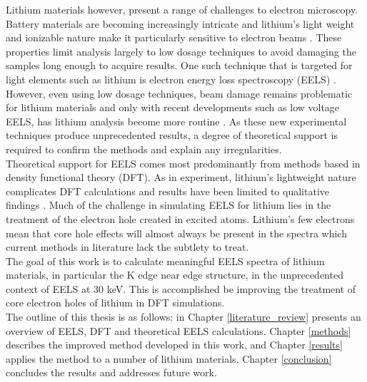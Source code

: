 Lithium materials however, present a range of challenges to electron microscopy.  Battery materials are becoming increasingly intricate and lithium's light weight and ionizable nature make it particularly sensitive to electron beams \cite{kobayashi_quantitative_2017}.  These properties limit analysis largely to low dosage techniques to avoid damaging the samples long enough to acquire results.  One such technique that is targeted for light elements such as lithium is electron energy loss spectroscopy (EELS) \cite{Egerton}.  However, even using low dosage techniques,  beam damage remains problematic for lithium materials and only with recent developments such as low voltage EELS, has lithium analysis become more routine \cite{SU_9000}. As these new experimental techniques produce unprecedented results, a degree of theoretical support is required to confirm the methods and explain any irregularities.  
\\

Theoretical support for EELS  comes most predominantly from methods based in density functional theory (DFT).  As in experiment, lithium's lightweight nature complicates DFT calculations and results have been limited to qualitative findings \cite{mauchamp_ab_2006, mauchamp_local_2008}. Much of the challenge in simulating EELS for lithium lies in the treatment of the electron hole created in excited atoms.  Lithium's few electrons mean that core hole effects will almost always be present in the spectra which current methods in literature lack the subtlety to treat. \\

The goal of this work is to calculate meaningful EELS spectra of lithium materials, in particular the K edge near edge structure, in the unprecedented context of EELS at 30 keV. This is accomplished be improving the treatment of core electron holes of lithium in DFT simulations. \\

The outline of this thesis is as follows: in Chapter \ref{literature_review} presents an overview of EELS, DFT and theoretical EELS calculations.  Chapter \ref{methods} describes the improved method developed in this work, and Chapter \ref{results} applies the method to a number of lithium materials.  Chapter \ref{conclusion} concludes the results and addresses future work.


